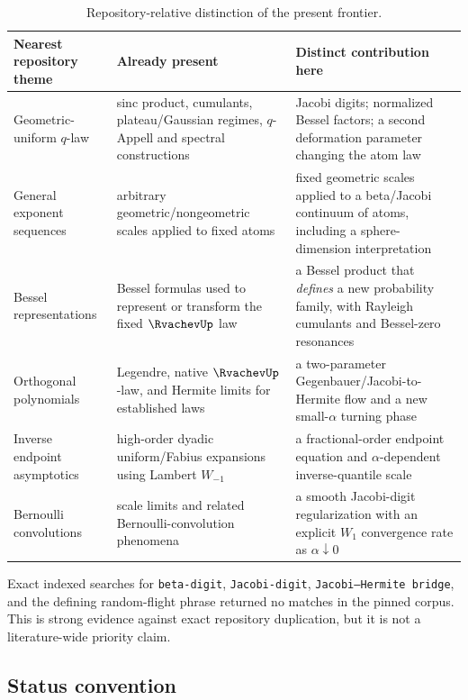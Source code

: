\documentclass[11pt]{article}
\theoremstyle{definition}
\theoremstyle{remark}
\begin{document}
\begin{table}[H]
\centering
\small
\begin{tabularx}{\textwidth}{@{}p{}X X@{}}
\toprule
Nearest repository theme & Already present & Distinct contribution here \\
\midrule
Geometric-uniform \(q\)-law
& sinc product, cumulants, plateau/Gaussian regimes, \(q\)-Appell and spectral constructions
& Jacobi digits; normalized Bessel factors; a second deformation parameter changing the atom law \\
\addlinespace
General exponent sequences
& arbitrary geometric/nongeometric scales applied to fixed atoms
& fixed geometric scales applied to a beta/Jacobi continuum of atoms, including a sphere-dimension interpretation \\
\addlinespace
Bessel representations
& Bessel formulas used to represent or transform the fixed \(\RvachevUp\) law
& a Bessel product that \emph{defines} a new probability family, with Rayleigh cumulants and Bessel-zero resonances \\
\addlinespace
Orthogonal polynomials
& Legendre, native \(\RvachevUp\)-law, and Hermite limits for established laws
& a two-parameter Gegenbauer/Jacobi-to-Hermite flow and a new small-\(\alpha\) turning phase \\
\addlinespace
Inverse endpoint asymptotics
& high-order dyadic uniform/Fabius expansions using Lambert \(W_{-1}\)
& a fractional-order endpoint equation and \(\alpha\)-dependent inverse-quantile scale \\
\addlinespace
Bernoulli convolutions
& scale limits and related Bernoulli-convolution phenomena
& a smooth Jacobi-digit regularization with an explicit \(W_1\) convergence rate as \(\alpha\downarrow0\) \\
\bottomrule
\end{tabularx}
\caption{Repository-relative distinction of the present frontier.}
\label{tab:crosswalk}
\end{table}

Exact indexed searches for \texttt{beta-digit}, \texttt{Jacobi-digit},
\texttt{Jacobi--Hermite bridge}, and the defining random-flight phrase returned
no matches in the pinned corpus.  This is strong evidence against exact
repository duplication, but it is not a literature-wide priority claim.

\subsection{Status convention}
\end{document}
